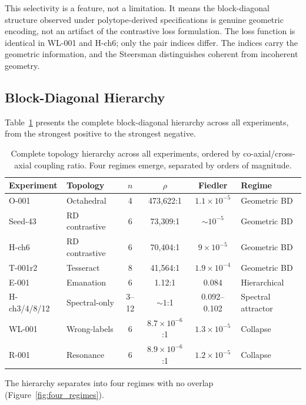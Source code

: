 This selectivity is a feature, not a limitation. It means the
block-diagonal structure observed under polytope-derived specifications
is genuine geometric encoding, not an artifact of the contrastive loss
formulation. The loss function is identical in WL-001 and H-ch6; only
the pair indices differ. The indices carry the geometric information,
and the Steersman distinguishes coherent from incoherent geometry.

\subsection{Block-Diagonal Hierarchy}

Table~\ref{tab:hierarchy} presents the complete block-diagonal hierarchy
across all experiments, from the strongest positive to the strongest
negative.

\begin{table}[H]
\centering
\caption{Complete topology hierarchy across all experiments, ordered
  by co-axial/cross-axial coupling ratio. Four regimes emerge,
  separated by orders of magnitude.}
\label{tab:hierarchy}
\small
\begin{tabular}{llcccl}
\toprule
Experiment & Topology & $n$ & $\rho$ & Fiedler & Regime \\
\midrule
O-001 & Octahedral & 4 & 473{,}622:1 & $1.1 \times 10^{-5}$ & Geometric BD \\
Seed-43 & RD contrastive & 6 & 73{,}309:1 & ${\sim}10^{-5}$ & Geometric BD \\
H-ch6 & RD contrastive & 6 & 70{,}404:1 & $9 \times 10^{-5}$ & Geometric BD \\
T-001r2 & Tesseract & 8 & 41{,}564:1 & $1.9 \times 10^{-4}$ & Geometric BD \\
\midrule
E-001 & Emanation & 6 & 1.12:1 & 0.084 & Hierarchical \\
\midrule
H-ch3/4/8/12 & Spectral-only & 3--12 & ${\sim}1$:1 & 0.092--0.102 & Spectral attractor \\
\midrule
WL-001 & Wrong-labels & 6 & $8.7 \times 10^{-6}$:1 & $1.3 \times 10^{-5}$ & Collapse \\
R-001 & Resonance & 6 & $8.9 \times 10^{-6}$:1 & $1.2 \times 10^{-5}$ & Collapse \\
\bottomrule
\end{tabular}
\end{table}

The hierarchy separates into four regimes with no overlap
(Figure~\ref{fig:four_regimes}).

